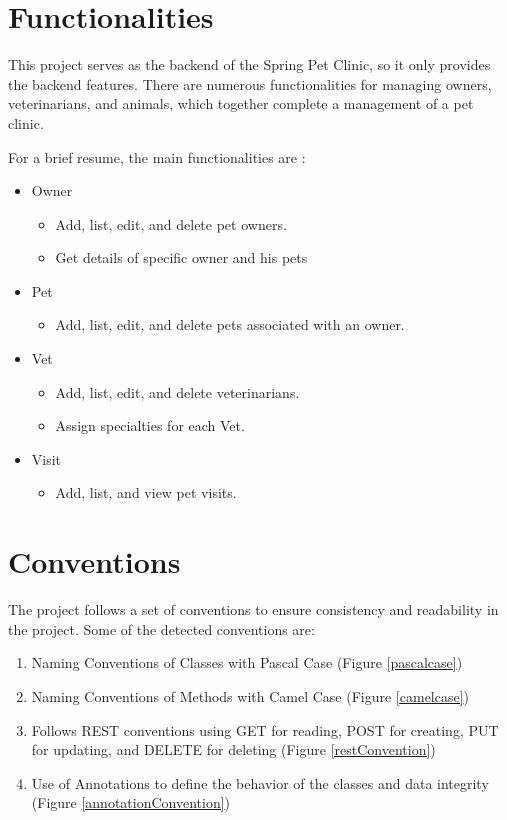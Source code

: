 \documentclass[a4paper,11pt,openright,BCOR=15mm]{scrbook}
\begin{document}
		\section{Functionalities}\label{functionalities}

		This project serves as the backend of the Spring Pet Clinic, so it only provides the backend features. There are numerous functionalities for managing owners, veterinarians, and animals, which together complete a management of a pet clinic.

		For a brief resume, the main functionalities are :
		\begin{itemize}
			\item Owner
			\begin{itemize}
				\item Add, list, edit, and delete pet owners. 
				\item Get details of specific owner and his pets
			\end{itemize}
			\item Pet
			\begin{itemize}
				\item Add, list, edit, and delete pets associated with an owner. 
			\end{itemize}
			\item Vet
			\begin{itemize}
				\item Add, list, edit, and delete veterinarians. 
				\item Assign specialties for each Vet. 
			\end{itemize}
			\item Visit
			\begin{itemize}
				\item Add, list, and view pet visits. 
			\end{itemize}
		\end{itemize}
		
		\section{Conventions}
		The project follows a set of conventions to ensure consistency and readability in the project.
		Some of the detected conventions are:

		\begin{enumerate}
			\item Naming Conventions of Classes with Pascal Case (Figure \ref{pascalcase})
			\item Naming Conventions of Methods with Camel Case (Figure \ref{camelcase})
			\item Follows REST conventions using GET for reading, POST for creating, PUT for updating, and DELETE for deleting (Figure \ref{restConvention})
			\item Use of Annotations to define the behavior of the classes and data integrity (Figure \ref{annotationConvention})
		\end{enumerate}
\end{document}
